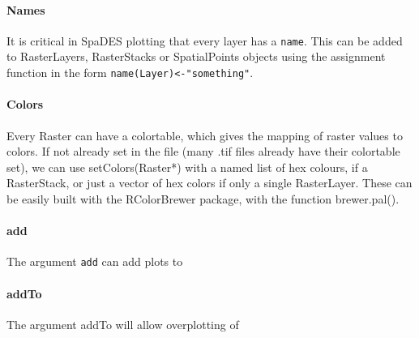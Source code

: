 \documentclass{article}
\begin{document}
\paragraph{Names}
It is critical in SpaDES plotting that every layer has a \texttt{name}. This can be added to RasterLayers, RasterStacks or SpatialPoints objects using the assignment function in the form \texttt{name(Layer)<-"something"}.

\paragraph{Colors}
Every Raster can have a colortable, which gives the mapping of raster values to colors. If not already set in the file (many .tif files already have their colortable set), we can use setColors(Raster*) with a named list of hex colours, if a RasterStack, or just a vector of hex colors if only a single RasterLayer. These can be easily built with the RColorBrewer package, with the function brewer.pal().

\paragraph{add}
The argument \texttt{add} can add plots to

\paragraph{addTo}
The argument addTo will allow overplotting of
\end{document}
